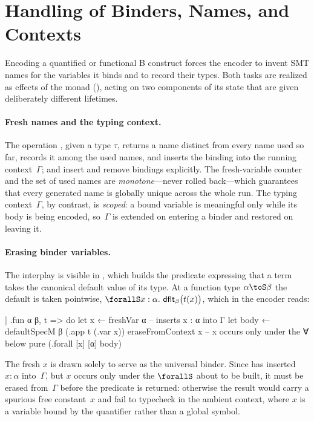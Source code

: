 \section{Handling of Binders, Names, and Contexts}
\label{sec:binders-names-contexts}

Encoding a quantified or functional B construct forces the encoder to invent SMT
names for the variables it binds and to record their types. Both tasks are realized
as effects of the {\small{}} monad
(), acting on two components of its state
that are given deliberately different lifetimes.

\paragraph{Fresh names and the typing context.}
The operation {\small{}}, given a type
$\tau$, returns a name distinct from every name used so far, records it among the
used names, and inserts the binding into the running context~$\Gamma$;
{\small{}} and
{\small{}} insert and
remove bindings explicitly. The fresh-variable counter and the set of used names are
\emph{monotone}---never rolled back---which guarantees that every generated name is
globally unique across the whole run. The typing context~$\Gamma$, by contrast, is
\emph{scoped}: a bound variable is meaningful only while its body is being encoded,
so~$\Gamma$ is extended on entering a binder and restored on leaving it.

\paragraph{Erasing binder variables.}
The interplay is visible in
{\small{}}, which builds
the predicate expressing that a term takes the canonical default value of its
type. At a function type $\alpha \toS \beta$ the default is taken
pointwise, $\forallS x : \alpha.\ \mathsf{dflt}_{\beta}\bigl(t(x)\bigr)$, which in the
encoder reads:
\begin{leanlisting}
| .fun α β, t => do
    let x    ← freshVar α                     -- inserts x : α into Γ
    let body ← defaultSpecM β (.app t (.var x))
    eraseFromContext x                        -- x occurs only under the ∀ below
    pure (.forall [x] [α] body)
\end{leanlisting}
The fresh $x$ is drawn solely to serve as the universal binder. Since
 has inserted $x : \alpha$ into~$\Gamma$, but $x$ occurs only under
the $\forallS$ about to be built, it must be erased from~$\Gamma$ before the
predicate is returned: otherwise the result would carry a spurious free constant~$x$
and fail to typecheck in the ambient context, where $x$ is a variable bound by the
quantifier rather than a global symbol.

